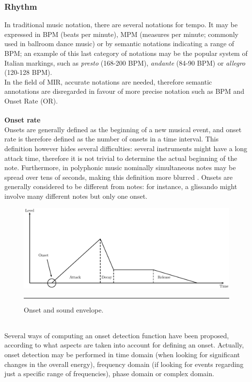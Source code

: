 \subsubsection{Rhythm}
In traditional music notation, there are several notations for tempo. It may be expressed in BPM (beats per minute), MPM (measures per minute; commonly used in ballroom dance music) or by semantic notations indicating a range of BPM; an example of this last category of notations may be the popular system of Italian markings, such as \textit{presto} (168-200 BPM), \textit{andante} (84-90 BPM) or \textit{allegro} (120-128 BPM). \\ In the field of MIR, accurate notations are needed, therefore semantic annotations are disregarded in favour of more precise notation such as BPM and Onset Rate (OR).
\\ \\ 
\textbf{Onset rate} \\ 
Onsets are generally defined as the beginning of a new musical event, and onset rate is therefore defined as the number of onsets in a time interval. This definition however hides several difficulties: several instruments might have a long attack time, therefore it is not trivial to determine the actual beginning of the note. Furthermore, in polyphonic music nominally simultaneous notes may be spread over tens of seconds, making this definition more blurred \cite{dixon06}. Onsets are generally considered to be different from notes: for instance, a glissando might involve many different notes but only one onset.
\begin{figure}[h]
\begin{center}
\includegraphics[scale=0.75]{Figures/onsets.pdf}
    \rule{20em}{0.5pt}
  \caption[Onset and sound envelope]{Onset and sound envelope.}
  \label{fig:Onsets}
\end{center}
\end{figure} \\
Several ways of computing an onset detection function have been proposed, according to what aspects are taken into account for defining an onset. Actually, onset detection may be performed in time domain (when looking for significant changes in the overall energy), frequency domain (if looking for events regarding just a specific range of frequencies), phase domain or complex domain. 
